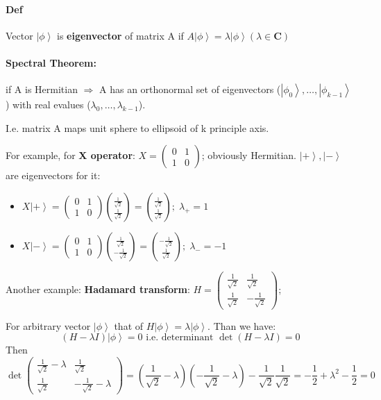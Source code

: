 \documentclass{scrartcl}
\newcommand{\ket}[1]{\left| #1 \right>} %
\begin{document}
\paragraph{Def} Vector $\ket\phi$ is {\bf eigenvector} of matrix A if $A\ket\phi
= \lambda\ket\phi (\lambda \in \mathbf{C})$

\paragraph{Spectral Theorem: } if A is Hermitian $\Rightarrow$ A has an
orthonormal set of eigenvectors ($\ket{\phi_0}, \dots, \ket{\phi_{k-1}}$) with
real evalues ($\lambda_0, \dots, \lambda_{k-1}$).

I.e. matrix A maps unit sphere to ellipsoid of k principle axis.

For example, for {\bf X operator}: $X = \begin{pmatrix} 0 & 1 \\ 1&
  0 \end{pmatrix}$; obviously Hermitian. $\ket+,\ket-$ are eigenvectors for it:
\begin{itemize}
\item $X\ket+ = \begin{pmatrix} 0 & 1 \\ 1 &
    0 \end{pmatrix}\binom{\frac1{\sqrt2}}{\frac1{\sqrt2}} =
  \binom{\frac1{\sqrt2}}{\frac1{\sqrt2}}; \; \lambda_+ = 1 $
\item $X\ket- = \begin{pmatrix} 0 & 1 \\ 1 &
    0 \end{pmatrix}\binom{\frac1{\sqrt2}}{-\frac1{\sqrt2}} =
  \binom{-\frac1{\sqrt2}}{\frac1{\sqrt2}}; \; \lambda_- = -1 $
\end{itemize}

Another example: {\bf Hadamard transform}: $H = \begin{pmatrix} \frac1{\sqrt2} &
  \frac1{\sqrt2} \\ \frac1{\sqrt2}& -\frac1{\sqrt2} \end{pmatrix}$;

For arbitrary vector $\ket\phi$ that of $H \ket\phi = \lambda\ket\phi$. Than we
have: $$(H-\lambda I)\ket\phi = 0 \text{ i.e. determinant } \det(H-\lambda I) =
0$$
Then $$\det \begin{pmatrix} \frac1{\sqrt2} - \lambda & \frac1{\sqrt2} \\
  \frac1{\sqrt2} & -\frac1{\sqrt2} - \lambda \end{pmatrix} =
\left(\frac1{\sqrt2} - \lambda \right)\left( -\frac1{\sqrt2} - \lambda \right) -
\frac1{\sqrt2} \frac1{\sqrt2} = -\frac12 + \lambda^2 -\frac12 = 0$$
\end{document}
